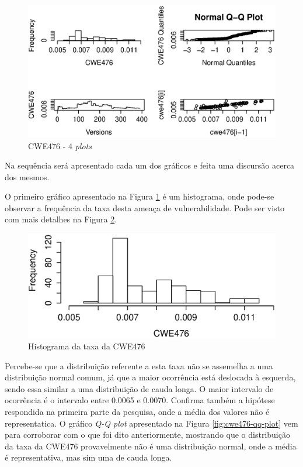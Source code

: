 \begin{figure}[h]
  \centering
  \includegraphics[width=1.0\textwidth]
      {figuras/cwe476-4-plot.eps}
      \caption{CWE476 - 4 \textit{plots}}
  \label{fig:cwe476-4-plot}
\end{figure}

Na sequência será apresentado cada um dos gráficos e feita uma discursão acerca
dos mesmos.

O primeiro gráfico apresentado na Figura \ref{fig:cwe476-4-plot} é um
histograma, onde pode-se observar a frequência da taxa desta ameaça de
vulnerabilidade. Pode ser visto com mais detalhes na Figura
\ref{fig:cwe476-hist}.

\begin{figure}[h]
  \centering
  \includegraphics[width=1.0\textwidth]
      {figuras/cwe476-hist.eps}
      \caption{Histograma da taxa da CWE476}
      \label{fig:cwe476-hist}
\end{figure}

Percebe-se que a distribuição referente a esta taxa não se assemelha
a uma distribuição normal comum, já que a maior ocorrência está deslocada à
esquerda, sendo essa similar a uma distribuição de cauda longa. O maior
intervalo de ocorrência é o intervalo entre 0.0065 e 0.0070. Confirma também a
hipótese respondida na primeira parte da pesquisa, onde a média dos valores não
é representatica. O gráfico \textit{Q-Q plot} apresentado na Figura
\ref{fig:cwe476-qq-plot} vem para corroborar com o que foi dito anteriormente,
mostrando que o distribuição da taxa da CWE476 provavelmente não é uma
distribuição normal, onde a média é representativa, mas sim uma de cauda
longa.

